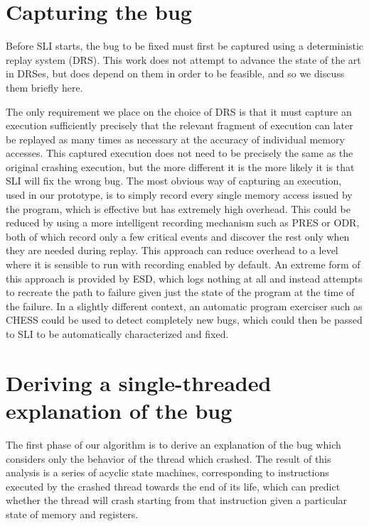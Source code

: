\documentclass[10pt,twocolumn,preprint,natbib,authoryear]{sigplanconf}
\begin{document}
\section{Capturing the bug}

Before SLI starts, the bug to be fixed must first be captured using a
deterministic replay system (DRS).  This work does not attempt to
advance the state of the art in DRSes, but does depend on them in
order to be feasible, and so we discuss them briefly here.

The only requirement we place on the choice of DRS is that it must
capture an execution sufficiently precisely that the relevant fragment
of execution can later be replayed as many times as necessary at the
accuracy of individual memory accesses.  This captured execution does
not need to be precisely the same as the original crashing execution,
but the more different it is the more likely it is that SLI will fix
the wrong bug.  The most obvious way of capturing an execution, used
in our prototype, is to simply record every single memory access
issued by the program, which is effective but has extremely high
overhead.  This could be reduced by using a more intelligent recording
mechanism such as PRES\cite{Park2009} or ODR\cite{Altekar2009}, both
of which record only a few critical events and discover the rest only
when they are needed during replay.  This approach can reduce overhead
to a level where it is sensible to run with recording enabled by
default.  An extreme form of this approach is provided by
ESD\cite{Zamfir2010}, which logs nothing at all and instead attempts
to recreate the path to failure given just the state of the program at
the time of the failure.  In a slightly different context, an
automatic program exerciser such as CHESS\cite{Musuvathi2008} could be
used to detect completely new bugs, which could then be passed to SLI
to be automatically characterized and fixed.

\section{Deriving a single-threaded explanation of the bug}
\label{sect:build_state_machines}

The first phase of our algorithm is to derive an explanation of the
bug which considers only the behavior of the thread which crashed.
The result of this analysis is a series of acyclic state machines,
corresponding to instructions executed by the crashed thread towards
the end of its life, which can predict whether the thread will crash
starting from that instruction given a particular state of memory and
registers.
\end{document}
